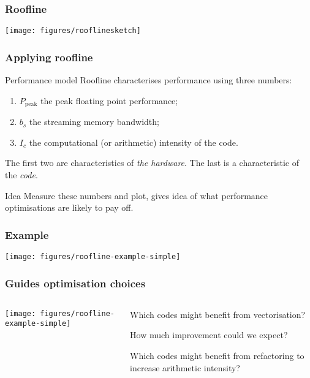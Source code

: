 \documentclass[presentation,aspectratio=43,10pt]{beamer}
\begin{document}
\begin{frame}
  \frametitle{Roofline}
  \begin{center}
    \texttt{[image: figures/rooflinesketch]}
  \end{center}
\end{frame}

\begin{frame}
  \frametitle{Applying roofline}
  \begin{challenge}{Performance model}
    Roofline  characterises performance using three numbers:
    \begin{enumerate}
    \item $P_\text{peak}$ the peak floating point performance;
    \item $b_s$ the streaming memory bandwidth;
    \item $I_c$ the computational (or arithmetic) intensity of the code.
    \end{enumerate}

    The first two are characteristics of \emph{the hardware}. The last
    is a characteristic of the \emph{code}.
  \end{challenge}
  \begin{answer}{Idea}
    Measure these numbers and plot, gives idea of what performance
    optimisations are likely to pay off.
  \end{answer}
\end{frame}

\begin{frame}
  \frametitle{Example}
  \begin{center}
    \texttt{[image: figures/roofline-example-simple]}
  \end{center}
\end{frame}

\begin{frame}
  \frametitle{Guides optimisation choices}
  \begin{columns}
    \begin{column}{0.45\textwidth}
      \begin{center}
        \texttt{[image: figures/roofline-example-simple]}
      \end{center}
    \end{column}
    \begin{column}{0.45\textwidth}
      Which codes might benefit from vectorisation?

      How much improvement could we expect?

      Which codes might benefit from refactoring to increase
      arithmetic intensity?
    \end{column}
  \end{columns}
\end{frame}
\end{document}
